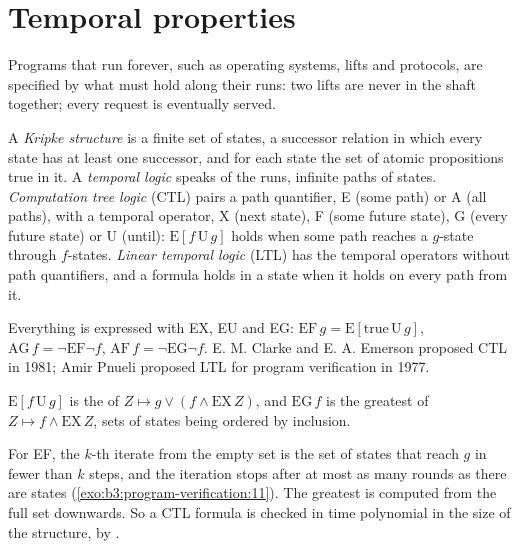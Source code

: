 \section{Temporal properties}\label{sec:b3:program-verification:temporal}

Programs that run forever, such as operating systems, lifts and protocols, are specified by what must hold along their runs: two lifts are never in the shaft together; every request is eventually served.

\begin{definition}\label{def:b3:program-verification:kripke}
A \emph{Kripke structure} is a finite set of states, a successor relation in which every state has at least one successor, and for each state the set of atomic propositions true in it. A \emph{temporal logic} speaks of the runs, infinite paths of states. \emph{Computation tree logic} (CTL) pairs a path quantifier, E (some path) or A (all paths), with a temporal operator, X (next state), F (some future state), G (every future state) or U (until): $\mathrm{E}[f \,\mathrm{U}\, g]$ holds when some path reaches a $g$-state through $f$-states. \emph{Linear temporal logic} (LTL) has the temporal operators without path quantifiers, and a formula holds in a state when it holds on every path from it.
\end{definition}

Everything is expressed with EX, EU and EG: $\mathrm{EF}\,g = \mathrm{E}[\mathrm{true} \,\mathrm{U}\, g]$, $\mathrm{AG}\,f = \neg \mathrm{EF} \neg f$, $\mathrm{AF}\,f = \neg \mathrm{EG} \neg f$. E. M. Clarke and E. A. Emerson proposed CTL in 1981; Amir Pnueli proposed LTL for program verification in 1977. %

\begin{theorem}\label{thm:b3:program-verification:fixpoints}
$\mathrm{E}[f \,\mathrm{U}\, g]$ is the  of $Z \mapsto g \vee (f \wedge \mathrm{EX}\,Z)$, and $\mathrm{EG}\,f$ is the greatest  of $Z \mapsto f \wedge \mathrm{EX}\,Z$, sets of states being ordered by inclusion.
\end{theorem}

For EF, the $k$-th iterate from the empty set is the set of states that reach $g$ in fewer than $k$ steps, and the iteration stops after at most as many rounds as there are states (\cref{exo:b3:program-verification:11}). The greatest  is computed from the full set downwards. So a CTL formula is checked in time polynomial in the size of the structure, by .

